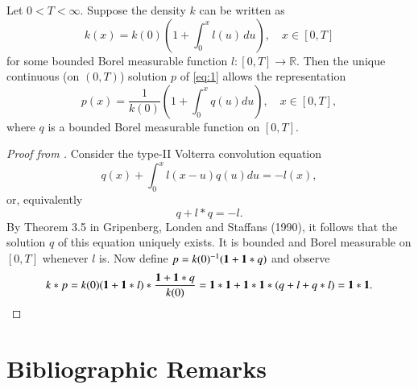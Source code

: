 \begin{lemma} \label{lemma:1}
Let $0 < T < \infty$. Suppose the density $k$ can be written as
\[
k(x) = k(0) \left(1 + \int_0^x l(u) \, du \right), \quad x \in [0,T]
\]
for some bounded Borel measurable function $l: [0,T] \to \mathbb{R}$. Then the unique continuous (on $(0,T)$) solution $p$ of \eqref{eq:1} allows the representation
\[
p(x) = \frac{1}{k(0)} \left(1 + \int_0^x q(u)du \right), \quad x \in [0,T],
\]
where $q$ is a bounded Borel measurable function on $[0,T]$.
\end{lemma}
\begin{proof}[Proof from \cite{74}] 
Consider the type-II Volterra convolution equation
\[ q(x) + \int_0^x l(x-u)q(u) du = -l(x), \]
or, equivalently
\[ q + l*q = -l. \]
By Theorem 3.5 in Gripenberg, Londen and Staffans (1990), it follows that the solution $q$ of this equation uniquely exists. It is bounded and Borel measurable on $[0, T]$ whenever $l$ is. Now define $p = k(0)^{-1}(\mathbf{1} + \mathbf{1}*q)$ and observe
\[
k*p = k(0)(\mathbf{1} + \mathbf{1}*l) * \frac{\mathbf{1} + \mathbf{1}*q}{k(0)} = \mathbf{1}*\mathbf{1} + \mathbf{1}*\mathbf{1}*(q+l+q*l) = \mathbf{1}*\mathbf{1}.
\]
\qedhere
\end{proof}


\section{Bibliographic Remarks} 

